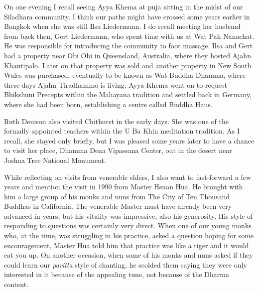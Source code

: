 On one evening I recall seeing Ayya Khema\cite{khema}
at puja sitting in the midst of our Siladhara community. I
think our paths might have crossed some years earlier in Bangkok when
she was still Ilsa Liedermann. I do recall meeting her husband from back
then, Gert Liedermann, who spent time with us at Wat Pah Nanachat. He
was responsible for introducing the community to foot massage. Ilsa and
Gert had a property near Obi Obi in Queensland, Australia, where they
hosted Ajahn Khantipalo. Later on that property was sold and another
property in New South Wales was purchased, eventually to be known as Wat
Buddha Dhamma, where these days Ajahn Tiradhammo is living. Ayya Khema
went on to request Bhikshuni Precepts within the Mahayana tradition and
settled back in Germany, where she had been born, establishing a centre
called Buddha Haus\cite{buddha-haus}.

Ruth Denison\cite{denison}
also visited Chithurst in the early days. She was
one of the formally appointed teachers within the U Ba Khin meditation
tradition. As I recall, she stayed only briefly, but I was pleased some
years later to have a chance to visit her place, Dhamma Dena Vipassana
Center, out in the desert near Joshua Tree National Monument\cite{joshua}.

While reflecting on visits from venerable elders, I also want to
fast-forward a few years and mention the visit in 1990 from Master Hsuan
Hua. He brought with him a large group of his monks and nuns from
The City of Ten Thousand Buddhas\cite{ten-thousand}
in California. The venerable Master must have already
been very advanced in years, but his vitality was impressive, also his
generosity. His style of responding to questions was certainly very direct.
When one of our young monks who, at the time, was struggling in his
practice, asked a question hoping for some encouragement, Master Hua
told him that practice was like a tiger and it would eat you up. On
another occasion, when some of his monks and nuns asked if they could
learn our \emph{paritta} style of chanting, he scolded them saying they
were only interested in it because of the appealing tune, not because of
the Dharma content.

